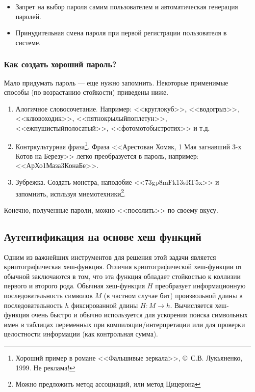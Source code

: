 \begin{frame}[allowframebreaks]
\begin{itemize}
    \item Запрет на выбор пароля самим пользователем и автоматическая генерация паролей.
    
    \item Принудительная смена пароля при первой регистрации пользователя в системе.

\end{itemize}
\end{frame}


\begin{frame}
\frametitle{Как создать хороший пароль?}
Мало придумать пароль --- еще нужно \alert{запомнить}. Некоторые применимые способы (по возрастанию стойкости) приведены ниже.

\begin{enumerate}
    \item \alert{Алогичное словосочетание.} Например: <<круглокуб>>, <<водогрыз>>, <<клювоходик>>, <<пятнокрылыйпоплетун>>, <<ежпушистыйполосатый>>, <<фотомотобыстротих>> и т.д.
    \item \alert{Контркультурная фраза}\footnote{Хороший пример в романе <<Фальшивые зеркала>>, \copyright~С.В. Лукьяненко, 1999. Не реклама!}. Фраза <<Арестован Хомяк, 1 Мая загнавший 3-х Котов на Березу>> легко преобразуется в пароль, например: <<АрХо1Маза3КонаБе>>.
    \item \alert{Зубрежка}. Создать монстра, наподобие <<73gp8mFk13sRT5x>> и запомнить, испльзуя мнемотехники\footnote{Можно предложить метод ассоциаций, или метод Цицерона}.
\end{enumerate}

Конечно, полученные пароли, можно <<посолить>> по своему вкусу.

\end{frame}


\subsection{Аутентификация на основе хеш функций}


Одним из важнейших инструментов для решения этой задачи является криптографическая хеш-функция. Отличия криптографической хеш-функции от обычной заключаются в том, что эта функция обладает стойкостью к коллизии первого и второго рода. Обычная хеш-функция $H$ преобразует информационную последовательность символов $M$ (в частном случае бит) произвольной длины в последовательность $h$ фиксированной длины $H:M\rightarrow h$. Вычисляется хеш-функция очень быстро и обычно используется для ускорения поиска символьных имен в таблицах переменных при компиляции/интерпретации или для проверки целостности информации (как контрольная сумма).


